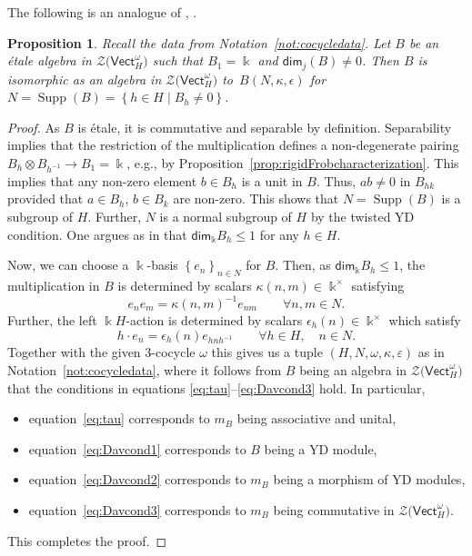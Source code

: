 \documentclass[pdftex]{sigma}
\numberwithin{equation}{section}
\newtheorem{Proposition}[Theorem]{Proposition}
 { \theoremstyle{definition}
\newtheorem{Definition}[Theorem]{Definition}
\newtheorem{Note}[Theorem]{Note}
\newtheorem{Notation}[Theorem]{Notation}
\newtheorem{Example}[Theorem]{Example}
\newtheorem{Remark}[Theorem]{Remark} }
\newcommand{\Set}[1]{\left\lbrace #1\right\rbrace}
\renewcommand{\dim}{\mathsf{dim}}
\newcommand{\Vect}{\mathsf{Vect}}
\newcommand{\cZ}{\mathcal{Z}}
\begin{document}
The following is an analogue of \cite[Proposition~3.11]{DS}, \cite[Proposition~3.4.2]{Dav3}.
\begin{Proposition}\label{prop:B-classification}
Recall the data from Notation~{\rm \ref{not:cocycledata}}.
 Let $B$ be an \'etale algebra in $\cZ\big(\Vect_H^\omega\big)$ such that $B_1=\Bbbk$ and $\dim_j(B)\neq 0$.
 Then $B$ is isomorphic as an algebra in $\cZ\big(\Vect_H^\omega\big)$ to~$B(N,\kappa,\epsilon)$ for $N=\operatorname{Supp}(B)=\Set{h\in H \mid B_h\neq 0 }$.
\end{Proposition}

\begin{proof}
As $B$ is \'etale, it is commutative and separable by definition. Separability implies that the restriction of the multiplication defines a non-degenerate pairing $B_h\otimes B_{h^{-1}}\to B_1=\Bbbk$, e.g., by Proposition~\ref{prop:rigidFrobcharacterization}.
This implies that any non-zero element $b\in B_h$ is a unit in $B$. Thus, $ab\neq 0$ in $B_{hk}$ provided that $a\in B_h$, $b\in B_k$ are non-zero. This shows that $N=\operatorname{Supp}(B)$ is a subgroup of $H$.
Further, $N$ is a normal subgroup of $H$ by the twisted YD condition.
One argues as in \cite[Lemma~3.4.1]{Dav3} that $\dim_\Bbbk B_h\leq 1$ for any $h\in H$.

Now, we can choose a $\Bbbk$-basis $\Set{e_n}_{n\in N}$ for $B$. Then, as $\dim_\Bbbk B_h\leq 1$, the multiplication in $B$ is determined by scalars $\kappa(n,m)\in \Bbbk^\times$ satisfying
\begin{equation*}e_n e_m = \kappa(n,m)^{-1}e_{nm} \qquad \forall n,m\in N.
\end{equation*}
Further, the left $\Bbbk H$-action is determined by scalars $\epsilon_h(n)\in \Bbbk^\times$ which satisfy
\begin{equation*}
 h\cdot e_n = \epsilon_h(n)e_{hnh^{-1}} \qquad \forall h\in H, \quad n\in N.
\end{equation*}
Together with the given $3$-cocycle $\omega$ this gives us a tuple $(H,N,\omega,\kappa,\varepsilon)$ as in Notation~\ref{not:cocycledata}, where it follows from $B$ being an algebra in $\cZ\big(\Vect_H^\omega\big)$ that the conditions in equations \eqref{eq:tau}--\eqref{eq:Davcond3} hold. In particular,
\begin{itemize}\itemsep=0pt
 \item equation~\eqref{eq:tau} corresponds to $m_B$ being associative and unital,
 \item equation~\eqref{eq:Davcond1} corresponds to $B$ being a YD module,
 \item equation~\eqref{eq:Davcond2} corresponds to $m_B$ being a morphism of YD modules,
 \item equation~\eqref{eq:Davcond3} corresponds to $m_B$ being commutative in $\cZ\big(\Vect_H^\omega\big)$.
\end{itemize}
This completes the proof.
\end{proof}
\end{document}
